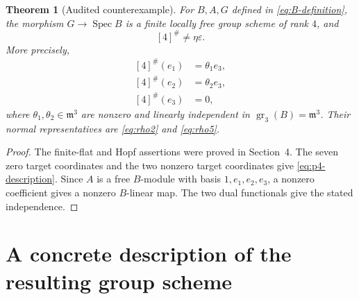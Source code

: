 \documentclass[11pt]{article}
\newtheorem{theorem}{Theorem}[section]
\theoremstyle{remark}
\newcommand{\Spec}{\operatorname{Spec}}
\newcommand{\gr}{\operatorname{gr}}
\newcommand{\m}{\mathfrak m}
\newcommand{\eps}{\varepsilon}
\begin{document}
\begin{theorem}[Audited counterexample]\label{thm:main}
For \(B,A,G\) defined in \eqref{eq:B-definition}, the morphism
\(G\to\Spec B\) is a finite locally free group scheme of rank \(4\), and
\[
  [4]^\#\ne\eta\eps.
\]
More precisely,
\begin{equation}\label{eq:p4-description}
\begin{aligned}
 [4]^\#(e_1)&=\theta_1e_3,\\
 [4]^\#(e_2)&=\theta_2e_3,\\
 [4]^\#(e_3)&=0,
\end{aligned}
\end{equation}
where \(\theta_1,\theta_2\in\m^3\) are nonzero and linearly independent in
\(\gr_3(B)=\m^3\).  Their normal representatives are
\eqref{eq:rho2} and \eqref{eq:rho5}.
\end{theorem}

\begin{proof}
The finite-flat and Hopf assertions were proved in Section~4.  The seven zero
target coordinates and the two nonzero target coordinates give
\eqref{eq:p4-description}.  Since \(A\) is a free \(B\)-module with basis
\(1,e_1,e_2,e_3\), a nonzero coefficient gives a nonzero \(B\)-linear map.
The two dual functionals give the stated independence.
\end{proof}

\section{A concrete description of the resulting group scheme}
\end{document}
